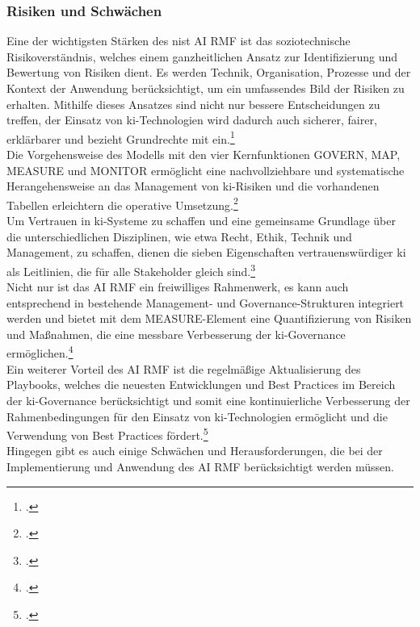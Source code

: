\subsubsection{Risiken und Schwächen}
\label{subsubsec:nist_stärken_schwächen}
Eine der wichtigsten Stärken des \ac{nist} AI RMF ist das soziotechnische Risikoverständnis, welches einem ganzheitlichen Ansatz zur Identifizierung und Bewertung von Risiken dient.
Es werden Technik, Organisation, Prozesse und der Kontext der Anwendung berücksichtigt, um ein umfassendes Bild der Risiken zu erhalten.
Mithilfe dieses Ansatzes sind nicht nur bessere Entscheidungen zu treffen, der Einsatz von \ac{ki}-Technologien wird dadurch auch sicherer, fairer, erklärbarer und bezieht Grundrechte mit ein.\footcite[4-5;12-18]{nationalinstituteofstandardsandtechnologyAIRiskManagement2021}
\\
Die Vorgehensweise des Modells mit den vier Kernfunktionen GOVERN, MAP, MEASURE und MONITOR ermöglicht eine nachvollziehbare und systematische Herangehensweise an das Management von \ac{ki}-Risiken und die vorhandenen Tabellen erleichtern die operative Umsetzung.\footcite[22-31]{nationalinstituteofstandardsandtechnologyAIRiskManagement2021}
\\
Um Vertrauen in \ac{ki}-Systeme zu schaffen und eine gemeinsame Grundlage über die unterschiedlichen Disziplinen, wie etwa Recht, Ethik, Technik und Management, zu schaffen, dienen die sieben Eigenschaften vertrauenswürdiger \ac{ki} als Leitlinien, die für alle Stakeholder gleich sind.\footcite[12-13]{nationalinstituteofstandardsandtechnologyAIRiskManagement2021}
\\
Nicht nur ist das AI RMF ein freiwilliges Rahmenwerk, es kann auch entsprechend in bestehende Management- und Governance-Strukturen integriert werden und bietet mit dem MEASURE-Element eine Quantifizierung von Risiken und Maßnahmen, die eine messbare Verbesserung der \ac{ki}-Governance ermöglichen.\footcite[33-34;28-31]{nationalinstituteofstandardsandtechnologyAIRiskManagement2021}
\\
Ein weiterer Vorteil des AI RMF ist die regelmäßige Aktualisierung des Playbooks, welches die neuesten Entwicklungen und Best Practices im Bereich der \ac{ki}-Governance berücksichtigt und somit eine kontinuierliche Verbesserung der Rahmenbedingungen für den Einsatz von \ac{ki}-Technologien ermöglicht und die Verwendung von Best Practices fördert.\footcite[iii;21]{nationalinstituteofstandardsandtechnologyAIRiskManagement2021}
\\
Hingegen gibt es auch einige Schwächen und Herausforderungen, die bei der Implementierung und Anwendung des AI RMF berücksichtigt werden müssen.
